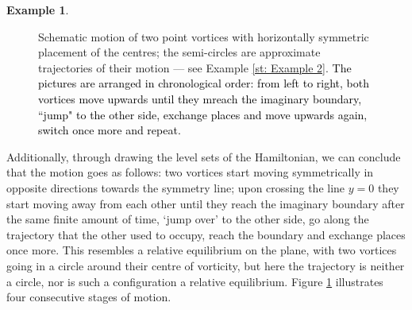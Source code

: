 \documentclass[11pt,twoside]{article}
\theoremstyle{definition}
\newtheorem{Exam}[theorem]{Example}
\numberwithin{equation}{section}
\begin{document}
\begin{Exam}
\begin{figure}
    \caption{Schematic motion of two point vortices with horizontally symmetric placement of the centres; the semi-circles are  approximate trajectories of their motion --- see Example \ref{st: Example 2}. \textcolor{black}{The pictures are arranged in chronological order: from left to right, both vortices move upwards until they mreach the imaginary boundary, ``jump" to the other side, exchange places and move upwards again, switch once more and repeat. }}
\label{fig:two vort opp vort period}
   \end{figure}
 
   Additionally, through drawing the level sets of the Hamiltonian, we can conclude that the motion goes as follows: two vortices start moving   symmetrically in opposite directions towards the symmetry line; upon crossing the line  $y =0$ they start moving away from each other  until they reach the imaginary boundary after the same finite amount of time, `jump over' to the other side, go along the trajectory that the other used to occupy, reach the boundary and exchange places once more. This resembles a relative equilibrium on the  plane, with two vortices going in a circle around their centre of vorticity, but here the trajectory is neither a circle, nor is such a configuration a  relative equilibrium.  Figure \ref{fig:two vort opp vort period} illustrates four consecutive stages of motion.
\end{Exam}
\end{document}
